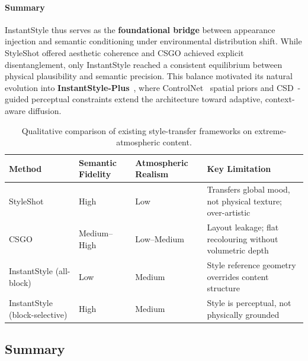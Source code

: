 \paragraph{Summary}
InstantStyle thus serves as the \textbf{foundational bridge} between appearance injection and semantic conditioning under environmental distribution shift.
While StyleShot offered aesthetic coherence and CSGO achieved explicit disentanglement, only InstantStyle reached a consistent equilibrium between physical plausibility and semantic precision.
This balance motivated its natural evolution into \textbf{InstantStyle-Plus}~\cite{wang2024instantstyleplus}, where ControlNet~\cite{zhang2023controlnet} spatial priors and CSD~\cite{somepalli2024csd}-guided perceptual constraints extend the architecture toward adaptive, context-aware diffusion.

\begin{table}[!h]
\centering
\caption{Qualitative comparison of existing style-transfer frameworks on extreme-atmospheric content.}
\label{tab:existing_solutions_comparison}
\renewcommand{\arraystretch}{1.3}
\begin{tabularx}{\textwidth}{lXXX}
\toprule
\textbf{Method} & \textbf{Semantic Fidelity} & \textbf{Atmospheric Realism} & \textbf{Key Limitation} \\
\midrule
StyleShot & High & Low & Transfers global mood, not physical texture; over-artistic \\
CSGO & Medium--High & Low--Medium & Layout leakage; flat recolouring without volumetric depth \\
InstantStyle (all-block) & Low & Medium & Style reference geometry overrides content structure \\
InstantStyle (block-selective) & High & Medium & Style is perceptual, not physically grounded \\
\bottomrule
\end{tabularx}
\end{table}

\FloatBarrier
\subsection{Summary}
\label{sec:comparison_existing}

